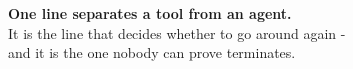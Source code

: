 \documentclass[aspectratio=169]{beamer}
\begin{document}
\begin{frame}[plain]
  \vfill
  \begin{center}
    {\Large\bfseries\color{popblue} One line separates a tool from an agent.}\\[0.8em]
    {\large It is the line that decides whether to go around again -}\\[0.25em]
    {\large and it is the one nobody can prove terminates.}
  \end{center}
  \vfill
\end{frame}
\end{document}
